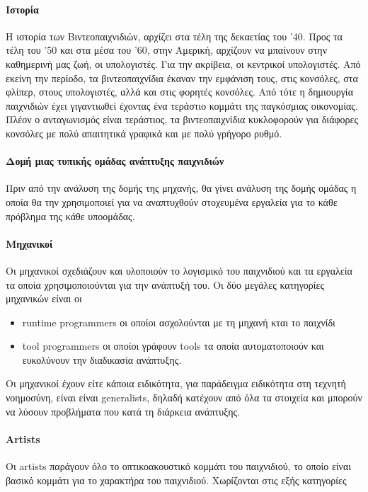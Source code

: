 \documentclass[oneside, 12pt]{book}
\begin{document}
	\paragraph{Ιστορία}
	Η ιστορία των Βιντεοπαιχνιδιών, αρχίζει στα τέλη της δεκαετίας του '40. Προς τα τέλη του '50 και στα μέσα του '60, στην Αμερική, αρχίζουν να μπαίνουν στην καθημερινή μας ζωή, οι υπολογιστές. Για την ακρίβεια, οι κεντρικοί υπολογιστές. Από εκείνη την περίοδο, τα βιντεοπαιχνίδια έκαναν την εμφάνιση τους, στις κονσόλες, στα φλίπερ, στους υπολογιστές, αλλά και στις φορητές κονσόλες. Από τότε η δημιουργία παιχνιδιών έχει γιγαντιωθεί έχοντας ένα τεράστιο κομμάτι της παγκόσμιας οικονομίας.
	Πλέον ο ανταγωνισμός είναι τεράστιος, τα βιντεοπαιχνίδια κυκλοφορούν για διάφορες κονσόλες με  πολύ απαιτητικά γραφικά και με πολύ γρήγορο ρυθμό.
	
	\paragraph{Δομή μιας τυπικής ομάδας ανάπτυξης παιχνιδιών}
	Πριν από την ανάλυση της δομής της μηχανής, θα γίνει ανάλυση της δομής ομάδας η οποία θα την χρησιμοποιεί για να αναπτυχθούν στοχευμένα εργαλεία για το κάθε πρόβλημα της κάθε υποομάδας.
	
	\paragraph{Μηχανικοί}	
	Οι μηχανικοί σχεδιάζουν και υλοποιούν το λογισμικό του παιχνιδιού και τα εργαλεία τα οποία χρησιμοποιούνται για την ανάπτυξή του. Οι δύο μεγάλες κατηγορίες μηχανικών είναι οι
	\begin{itemize}
		\item runtime programmers οι οποίοι ασχολούνται με τη μηχανή κται το παιχνίδι 
		\item tool programmers οι οποίοι γράφουν tools τα οποία αυτοματοποιούν και ευκολύνουν την διαδικασία ανάπτυξης.
	\end{itemize}
	Οι μηχανικοί έχουν είτε κάποια ειδικότητα, για παράδειγμα ειδικότητα στη τεχνητή νοημοσύνη, είναι είναι generalists, δηλαδή κατέχουν από όλα τα στοιχεία και μπορούν να λύσουν προβλήματα που κατά τη διάρκεια ανάπτυξης.
	
	\paragraph{Artists}
	Οι artists παράγουν όλο το οπτικοακουστικό κομμάτι του παιχνιδιού, το οποίο είναι βασικό κομμάτι για το χαρακτήρα του παιχνιδιού. Χωρίζονται στις εξής κατηγορίες
	
\end{document}
